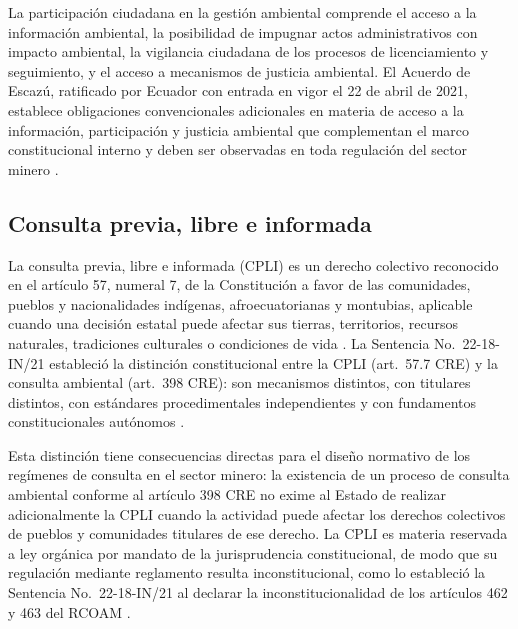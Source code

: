 La participación ciudadana en la gestión ambiental comprende el acceso a la información ambiental, la posibilidad de impugnar actos administrativos con impacto ambiental, la vigilancia ciudadana de los procesos de licenciamiento y seguimiento, y el acceso a mecanismos de justicia ambiental. El Acuerdo de Escazú, ratificado por Ecuador con entrada en vigor el 22 de abril de 2021, establece obligaciones convencionales adicionales en materia de acceso a la información, participación y justicia ambiental que complementan el marco constitucional interno y deben ser observadas en toda regulación del sector minero \parencite{acuerdo_escazu_2018}.

\subsection{Consulta previa, libre e informada}

La consulta previa, libre e informada (CPLI) es un derecho colectivo reconocido en el artículo 57, numeral 7, de la Constitución a favor de las comunidades, pueblos y nacionalidades indígenas, afroecuatorianas y montubias, aplicable cuando una decisión estatal puede afectar sus tierras, territorios, recursos naturales, tradiciones culturales o condiciones de vida \parencite{cre_2008}. La Sentencia No.\ 22-18-IN/21 estableció la distinción constitucional entre la CPLI (art.\ 57.7 CRE) y la consulta ambiental (art.\ 398 CRE): son mecanismos distintos, con titulares distintos, con estándares procedimentales independientes y con fundamentos constitucionales autónomos \parencite{cce_22_18_in_21}.

Esta distinción tiene consecuencias directas para el diseño normativo de los regímenes de consulta en el sector minero: la existencia de un proceso de consulta ambiental conforme al artículo 398 CRE no exime al Estado de realizar adicionalmente la CPLI cuando la actividad puede afectar los derechos colectivos de pueblos y comunidades titulares de ese derecho. La CPLI es materia reservada a ley orgánica por mandato de la jurisprudencia constitucional, de modo que su regulación mediante reglamento resulta inconstitucional, como lo estableció la Sentencia No.\ 22-18-IN/21 al declarar la inconstitucionalidad de los artículos 462 y 463 del RCOAM \parencite{cce_22_18_in_21,acuerdo_escazu_2018}.

